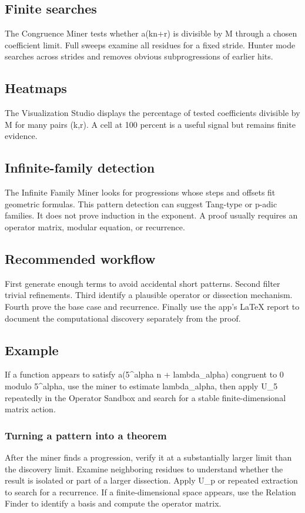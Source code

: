\documentclass[11pt]{article}
\begin{document}
\subsection*{Finite searches}
The Congruence Miner tests whether a(kn+r) is divisible by M through a chosen coefficient limit. Full sweeps examine all residues for a fixed stride. Hunter mode searches across strides and removes obvious subprogressions of earlier hits.

\subsection*{Heatmaps}
The Visualization Studio displays the percentage of tested coefficients divisible by M for many pairs (k,r). A cell at 100 percent is a useful signal but remains finite evidence.

\subsection*{Infinite-family detection}
The Infinite Family Miner looks for progressions whose steps and offsets fit geometric formulas. This pattern detection can suggest Tang-type or p-adic families. It does not prove induction in the exponent. A proof usually requires an operator matrix, modular equation, or recurrence.

\subsection*{Recommended workflow}
First generate enough terms to avoid accidental short patterns. Second filter trivial refinements. Third identify a plausible operator or dissection mechanism. Fourth prove the base case and recurrence. Finally use the app's LaTeX report to document the computational discovery separately from the proof.

\subsection*{Example}
If a function appears to satisfy a(5\textasciicircum{}alpha n + lambda\_alpha) congruent to 0 modulo 5\textasciicircum{}alpha, use the miner to estimate lambda\_alpha, then apply U\_5 repeatedly in the Operator Sandbox and search for a stable finite-dimensional matrix action.

\subsubsection*{Turning a pattern into a theorem}
After the miner finds a progression, verify it at a substantially larger limit than the discovery limit. Examine neighboring residues to understand whether the result is isolated or part of a larger dissection. Apply U\_p or repeated extraction to search for a recurrence. If a finite-dimensional space appears, use the Relation Finder to identify a basis and compute the operator matrix.
\end{document}
